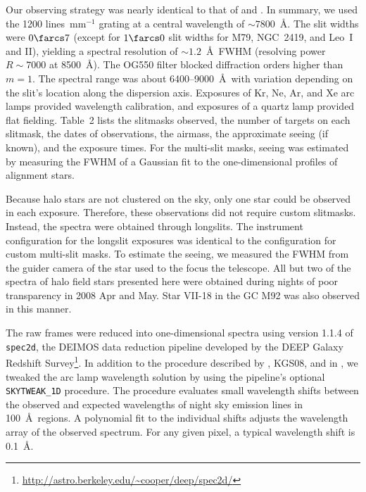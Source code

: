 \documentclass{emulateapj}
\begin{document}
Our observing strategy was nearly identical to that of \citet{guh06}
and \citet{sim07}.  In summary, we used the 1200 lines~mm$^{-1}$
grating at a central wavelength of $\sim 7800$~\AA.  The slit widths
were $0\farcs 7$ (except for $1\farcs 0$ slit widths for M79,
NGC~2419, and Leo~I and II), yielding a spectral resolution of $\sim
1.2$~\AA\ FWHM (resolving power $R \sim 7000$ at 8500~\AA).  The OG550
filter blocked diffraction orders higher than $m=1$.  The spectral
range was about 6400--9000~\AA\ with variation depending on the slit's
location along the dispersion axis.  Exposures of Kr, Ne, Ar, and Xe
arc lamps provided wavelength calibration, and exposures of a quartz
lamp provided flat fielding.  Table~2 lists the slitmasks observed,
the number of targets on each slitmask, the dates of observations, the
airmass, the approximate seeing (if known), and the exposure times.
For the multi-slit masks, seeing was estimated by measuring the FWHM
of a Gaussian fit to the one-dimensional profiles of alignment stars.


Because halo stars are not clustered on the sky, only one star could
be observed in each exposure.  Therefore, these observations did not
require custom slitmasks.  Instead, the spectra were obtained through
longslits.  The instrument configuration for the longslit exposures
was identical to the configuration for custom multi-slit masks.  To
estimate the seeing, we measured the FWHM from the guider camera of
the star used to the focus the telescope.  All but two of the spectra
of halo field stars presented here were obtained during nights of poor
transparency in 2008 Apr and May.  Star VII-18 in the GC M92 was also
observed in this manner.

The raw frames were reduced into one-dimensional spectra using version
1.1.4 of \texttt{spec2d}, the DEIMOS data reduction pipeline developed
by the DEEP Galaxy Redshift
Survey\footnote{\url{http://astro.berkeley.edu/~cooper/deep/spec2d/}}.
In addition to the procedure described by \citet{guh06}, KGS08, and in
\citeauthor*{kir09}, we tweaked the arc lamp wavelength solution by
using the pipeline's optional \texttt{SKYTWEAK\_1D} procedure.  The
procedure evaluates small wavelength shifts between the observed and
expected wavelengths of night sky emission lines in 100~\AA\ regions.
A polynomial fit to the individual shifts adjusts the wavelength array
of the observed spectrum.  For any given pixel, a typical wavelength
shift is 0.1~\AA.
\end{document}
